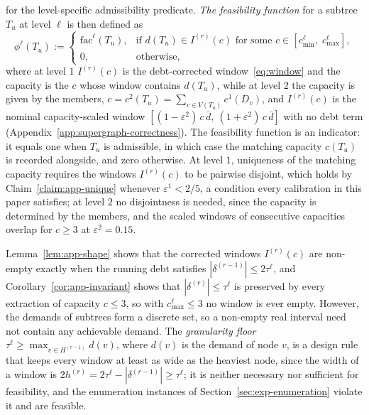 \documentclass[11pt]{article}
\theoremstyle{definition}
\begin{document}
%
for the level-specific admissibility predicate. \emph{The feasibility function} for a subtree $T_u$ at level $\ell$ is then defined as
%
\begin{equation}\label{eq:feasible-phi}
    \phi^\ell(T_u) := \begin{cases}
        \text{fac}^\ell(T_u), &
        \text{if } d(T_u) \in  I^{(r)}(c)
        \text{ for some } c \in [c_{\min}^{\ell},\; c_{\max}^{\ell}], \\[3pt]
        0, & \text{otherwise},
    \end{cases}
\end{equation}
where at level $1$ $I^{(r)}(c)$ is the debt-corrected window~\eqref{eq:window} and the capacity is the $c$ whose window contains $d(T_u)$, while at level $2$ the capacity is given by the members, $c = c^2(T_u) = \sum_{v \in V(T_u)} c^1(D_v)$, and $I^{(r)}(c)$ is the nominal capacity-scaled window $[(1-\varepsilon^2)\,c\,\bar d,\ (1+\varepsilon^2)\,c\,\bar d]$ with no debt term (Appendix~\ref{app:supergraph-correctness}). The feasibility function is an indicator: it equals one when $T_u$ is admissible, in which case the matching capacity $c(T_u)$ is recorded alongside, and zero otherwise. At level $1$, uniqueness of the matching capacity requires the windows $I^{(r)}(c)$ to be pairwise disjoint, which holds by Claim~\ref{claim:app-unique} whenever $\varepsilon^{1} < 2/5$, a condition every calibration in this paper satisfies; at level $2$ no disjointness is needed, since the capacity is determined by the members, and the scaled windows of consecutive capacities overlap for $c \geq 3$ at $\varepsilon^2 = 0.15$.

Lemma~\ref{lem:app-shape} shows that the corrected windows $I^{(r)}(c)$ are non-empty exactly when the running debt satisfies $|\delta^{(r-1)}| \leq 2\tau^{\ell}$, and Corollary~\ref{cor:app-invariant} shows that $|\delta^{(r)}| \leq \tau^{\ell}$ is preserved by every extraction of capacity $c \leq 3$, so with $c^{\ell}_{\max} \leq 3$ no window is ever empty. However, the demands of subtrees form a discrete set, so a non-empty real interval need not contain any achievable demand. The \emph{granularity floor} $\tau^{\ell} \geq \max_{v \in H^{(r-1)}} d(v)$, where $d(v)$ is the demand of node $v$, is a design rule that keeps every window at least as wide as the heaviest node, since the width of a window is $2h^{(r)} = 2\tau^{\ell} - |\delta^{(r-1)}| \geq \tau^{\ell}$; it is neither necessary nor sufficient for feasibility, and the enumeration instances of Section~\ref{sec:exp-enumeration} violate it and are feasible.
\end{document}

